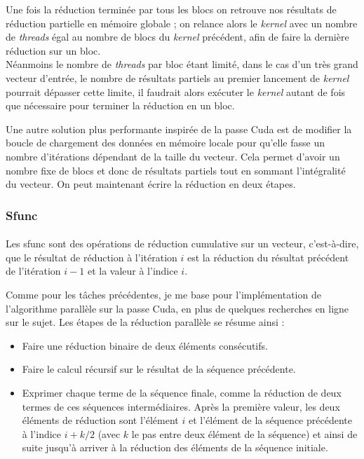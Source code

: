 Une fois la réduction terminée par tous les blocs on retrouve nos résultats de
réduction partielle en mémoire globale ; on relance alors le \emph{kernel} avec un
nombre de \emph{threads} égal au nombre de blocs du \emph{kernel} précédent, afin de
faire la dernière réduction sur un bloc.\\
Néanmoins le nombre de \emph{threads} par bloc étant limité, dans le cas d'un
très grand vecteur d'entrée, le nombre de résultats partiels au premier
lancement de \emph{kernel} pourrait dépasser cette limite, il faudrait alors
exécuter le \emph{kernel} autant de fois que nécessaire pour terminer la
réduction en un bloc.

Une autre solution plus performante inspirée de la passe Cuda est de modifier la
boucle de chargement des données en mémoire locale pour qu'elle fasse un nombre
d'itérations dépendant de la taille du vecteur. Cela permet d'avoir un nombre
fixe de blocs et donc de résultats partiels tout en sommant l'intégralité du
vecteur. On peut maintenant écrire la réduction en deux étapes.

\subsubsection{Sfunc}
\paragraph{}
Les sfunc sont des opérations de réduction cumulative sur un vecteur,
c'est-à-dire, que le résultat de réduction à l'itération $i$ est la réduction du
résultat précédent de l'itération $i-1$ et la valeur à l'indice $i$.

Comme pour les tâches précédentes, je me base pour l'implémentation de
l'algorithme parallèle sur la passe Cuda, en plus de quelques recherches en
ligne sur le sujet. Les étapes de la réduction parallèle se résume ainsi :
\begin{itemize}
   \item Faire une réduction binaire de deux éléments consécutifs.
   \item Faire le calcul récursif sur le résultat de la séquence précédente.
   \item Exprimer chaque terme de la séquence finale, comme la réduction de deux
      termes de ces séquences intermédiaires. Après la première valeur, les deux
      éléments de réduction sont l'élément $i$ et l'élément de la séquence
      précédente à l'indice $i+k/2$ (avec $k$ le pas entre deux élément de la
      séquence) et ainsi de suite jusqu'à arriver à la réduction des éléments de
      la séquence initiale.
\end{itemize}

